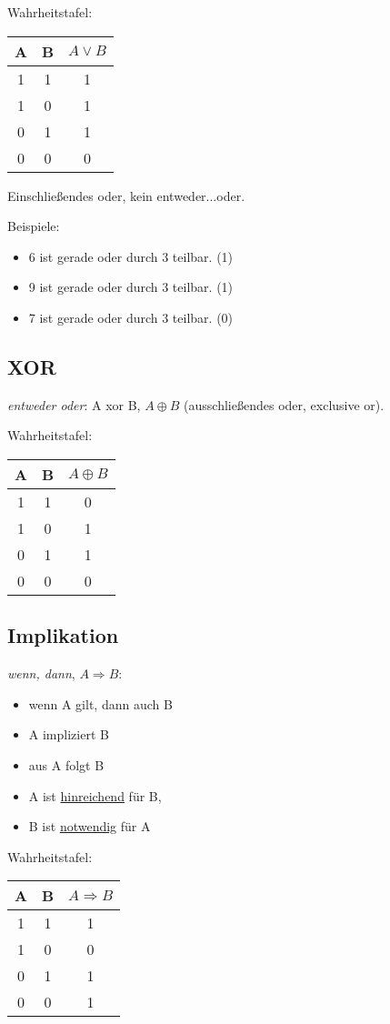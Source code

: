 \documentclass[a4paper, 12pt, twoside] {article}
\newcommand{\attention}{{\fontencoding{U}\fontfamily{futs}\selectfont\char 66\relax}\space}
\begin{document}
Wahrheitstafel: \qquad
\begin{tabular}{| c c | c |}
\hline
A & B & $A \lor B$ \\
\hline
1 & 1 & 1 \\
1 & 0 & 1 \\
0 & 1 & 1 \\
0 & 0 & 0 \\
\hline
\end{tabular}

\attention Einschließendes oder, kein entweder...oder.

Beispiele:
\begin{itemize}
\item 6 ist gerade oder durch 3 teilbar. (1)
\item 9 ist gerade oder durch 3 teilbar. (1)
\item 7 ist gerade oder durch 3 teilbar. (0)
\end{itemize}

\subsection{XOR}
\textit{entweder oder}: A xor B, $A \oplus B$ (ausschließendes oder, exclusive or).

Wahrheitstafel: \qquad
\begin{tabular}{| c c | c |}
\hline
A & B & $A \oplus B$ \\
\hline
1 & 1 & 0 \\
1 & 0 & 1 \\
0 & 1 & 1 \\
0 & 0 & 0 \\
\hline
\end{tabular}

\subsection{Implikation}
\textit{wenn, dann}, $A \Rightarrow B$:
\begin{itemize}
\item wenn A gilt, dann auch B
\item A impliziert B
\item aus A folgt B
\item A ist \underline{hinreichend} für B,
\item B ist \underline{notwendig} für A
\end{itemize}

Wahrheitstafel: \qquad
\begin{tabular}{| c c | c |}
\hline
A & B & $A \Rightarrow B$ \\
\hline
1 & 1 & 1 \\
1 & 0 & 0 \\
0 & 1 & 1 \\
0 & 0 & 1 \\
\hline
\end{tabular}
\end{document}
